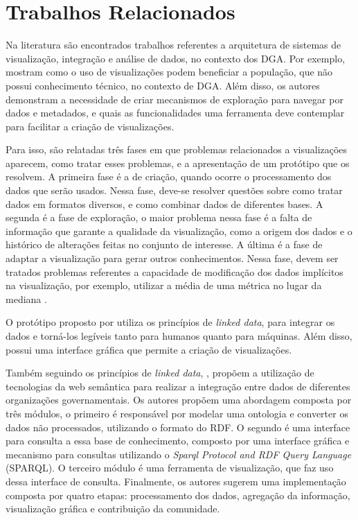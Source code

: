 
\chapter{Trabalhos Relacionados}
\label{chap:trabRelac}

Na literatura são encontrados trabalhos referentes a arquitetura de sistemas de visualização,
integração e análise de dados, no contexto dos DGA.  Por exemplo,  
mostram como o uso de visualizações podem beneficiar a população, que não possui conhecimento 
técnico, no contexto de DGA. Além disso, os autores demonstram a necessidade de criar 
mecanismos de exploração para navegar por dados e metadados, e quais as funcionalidades uma 
ferramenta deve contemplar para facilitar a criação de visualizações.

Para isso, são relatadas três fases em que problemas relacionados a visualizações aparecem, 
como tratar esses problemas, e a apresentação de um protótipo que os resolvem. A primeira fase 
é a de criação, quando ocorre o processamento dos dados que serão usados. Nessa fase, deve-se 
resolver questões sobre como tratar dados em formatos diversos, e como combinar dados de 
diferentes bases. A segunda é a fase de exploração, o maior problema nessa fase é a falta de 
informação que garante a qualidade da visualização, como a origem dos dados e o histórico de 
alterações feitas no conjunto de interesse. A última é a fase de adaptar a visualização para 
gerar outros conhecimentos. Nessa fase, devem ser tratados problemas referentes a capacidade 
de modificação dos dados implícitos na visualização, por exemplo, utilizar a média de uma 
métrica no lugar da mediana \cite{graves2013}.

O protótipo proposto por  utiliza os princípios de \textit{linked data}, 
para integrar os dados e torná-los legíveis tanto para humanos quanto para máquinas. Além 
disso, possui uma interface gráfica que permite a criação de visualizações.

Também seguindo os princípios de \textit{linked data}, , propõem a 
utilização de  tecnologias da web semântica para realizar a integração entre dados de 
diferentes organizações governamentais. Os autores propõem uma abordagem composta por três 
módulos, o primeiro é responsável por modelar uma ontologia e converter os dados não 
processados, utilizando o formato do RDF. O segundo é uma interface para consulta a essa base 
de conhecimento, composto por uma interface gráfica e mecanismo para consultas utilizando o 
\textit{Sparql Protocol and RDF Query Language} (SPARQL). O terceiro módulo é uma ferramenta 
de visualização, que faz uso dessa interface de consulta.  Finalmente, os autores sugerem uma 
implementação composta por quatro etapas: processamento dos dados, agregação da informação, 
visualização gráfica e contribuição da comunidade.

